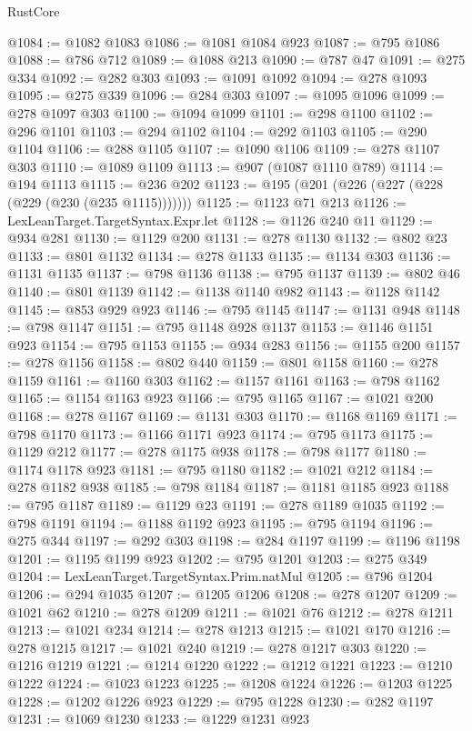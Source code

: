 \begin{lexlean}{RustCore}
\begin{coremodule}
@1084 := @1082 @1083
@1086 := @1081 @1084 @923
@1087 := @795 @1086
@1088 := @786 @712
@1089 := @1088 @213
@1090 := @787 @47
@1091 := @275 @334
@1092 := @282 @303
@1093 := @1091 @1092
@1094 := @278 @1093
@1095 := @275 @339
@1096 := @284 @303
@1097 := @1095 @1096
@1099 := @278 @1097 @303
@1100 := @1094 @1099
@1101 := @298 @1100
@1102 := @296 @1101
@1103 := @294 @1102
@1104 := @292 @1103
@1105 := @290 @1104
@1106 := @288 @1105
@1107 := @1090 @1106
@1109 := @278 @1107 @303
@1110 := @1089 @1109
@1113 := @907 (@1087 @1110 @789)
@1114 := @194 @1113
@1115 := @236 @202
@1123 := @195 (@201 (@226 (@227 (@228 (@229 (@230 (@235 @1115)))))))
@1125 := @1123 @71 @213
@1126 := LexLeanTarget.TargetSyntax.Expr.let
@1128 := @1126 @240 @11
@1129 := @934 @281
@1130 := @1129 @200
@1131 := @278 @1130
@1132 := @802 @23
@1133 := @801 @1132
@1134 := @278 @1133
@1135 := @1134 @303
@1136 := @1131 @1135
@1137 := @798 @1136
@1138 := @795 @1137
@1139 := @802 @46
@1140 := @801 @1139
@1142 := @1138 @1140 @982
@1143 := @1128 @1142
@1145 := @853 @929 @923
@1146 := @795 @1145
@1147 := @1131 @948
@1148 := @798 @1147
@1151 := @795 @1148 @928 @1137
@1153 := @1146 @1151 @923
@1154 := @795 @1153
@1155 := @934 @283
@1156 := @1155 @200
@1157 := @278 @1156
@1158 := @802 @440
@1159 := @801 @1158
@1160 := @278 @1159
@1161 := @1160 @303
@1162 := @1157 @1161
@1163 := @798 @1162
@1165 := @1154 @1163 @923
@1166 := @795 @1165
@1167 := @1021 @200
@1168 := @278 @1167
@1169 := @1131 @303
@1170 := @1168 @1169
@1171 := @798 @1170
@1173 := @1166 @1171 @923
@1174 := @795 @1173
@1175 := @1129 @212
@1177 := @278 @1175 @938
@1178 := @798 @1177
@1180 := @1174 @1178 @923
@1181 := @795 @1180
@1182 := @1021 @212
@1184 := @278 @1182 @938
@1185 := @798 @1184
@1187 := @1181 @1185 @923
@1188 := @795 @1187
@1189 := @1129 @23
@1191 := @278 @1189 @1035
@1192 := @798 @1191
@1194 := @1188 @1192 @923
@1195 := @795 @1194
@1196 := @275 @344
@1197 := @292 @303
@1198 := @284 @1197
@1199 := @1196 @1198
@1201 := @1195 @1199 @923
@1202 := @795 @1201
@1203 := @275 @349
@1204 := LexLeanTarget.TargetSyntax.Prim.natMul
@1205 := @796 @1204
@1206 := @294 @1035
@1207 := @1205 @1206
@1208 := @278 @1207
@1209 := @1021 @62
@1210 := @278 @1209
@1211 := @1021 @76
@1212 := @278 @1211
@1213 := @1021 @234
@1214 := @278 @1213
@1215 := @1021 @170
@1216 := @278 @1215
@1217 := @1021 @240
@1219 := @278 @1217 @303
@1220 := @1216 @1219
@1221 := @1214 @1220
@1222 := @1212 @1221
@1223 := @1210 @1222
@1224 := @1023 @1223
@1225 := @1208 @1224
@1226 := @1203 @1225
@1228 := @1202 @1226 @923
@1229 := @795 @1228
@1230 := @282 @1197
@1231 := @1069 @1230
@1233 := @1229 @1231 @923

\end{coremodule}
\end{lexlean}
